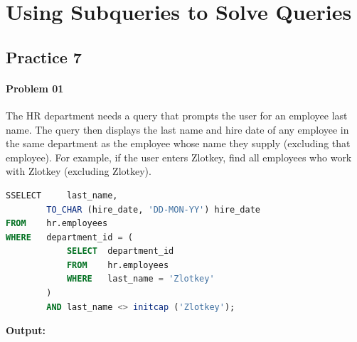 \chapter{Using Subqueries to Solve Queries}

\section{\textbf{Practice 7}}

\subsubsection*{Problem 01}
The HR department needs a query that prompts the user for an employee last name. The query then displays the last name and hire date of any employee in the same department as the employee whose name they supply (excluding that employee). For example, if the user enters Zlotkey, find all employees who work with Zlotkey (excluding Zlotkey).

\begin{frame}



\begin{lstlisting}[language=SQL]
SSELECT 	last_name,
       	TO_CHAR (hire_date, 'DD-MON-YY') hire_date
FROM 	hr.employees
WHERE 	department_id = (
         	SELECT 	department_id
         	FROM 	hr.employees
         	WHERE 	last_name = 'Zlotkey'
   		)
      	AND last_name <> initcap ('Zlotkey');
\end{lstlisting}
\textbf{Output: }
\end{frame}


